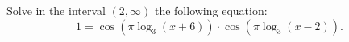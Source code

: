 Solve in the interval $ (2,\infty ) $ the following equation:
$$ 1=\cos\left( \pi\log_3 (x+6)\right)\cdot\cos\left( \pi\log_3 (x-2)\right) . $$